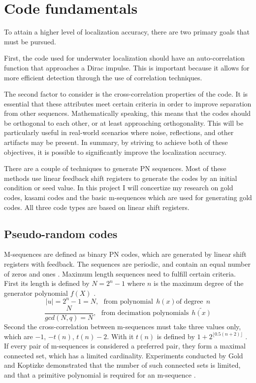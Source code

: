 \chapter{Code fundamentals}\label{chap:codefund}
To attain a higher level of localization accuracy, there are two primary goals that must be pursued.

First, the code used for underwater localization should have an auto-correlation function that approaches a Dirac impulse. This is important because it allows for more efficient detection through the use of correlation techniques.

The second factor to consider is the cross-correlation properties of the code. It is essential that these attributes meet certain criteria in order to improve separation from other sequences. Mathematically speaking, this means that the codes should be orthogonal to each other, or at least approaching orthogonality. This will be particularly useful in real-world scenarios where noise, reflections, and other artifacts may be present.
In summary, by striving to achieve both of these objectives, it is possible to significantly improve the localization accuracy.

There are a couple of techniques to generate PN sequences. Most of these methods use linear feedback shift registers to generate the codes by an initial condition or seed value. In this project I will concertize my research on gold codes, kasami codes and the basic m-sequences which are used for generating gold codes. All three code types are based on linear shift registers.

\section{Pseudo-random codes}
M-sequences are defined as binary PN codes, which are generated by linear shift registers with feedback. The sequences are periodic, and contain an equal number of zeros and ones \cite{proakis08}. 
Maximum length sequences need to fulfill certain criteria.  First its length is defined by $N=2^n - 1$ where $n$ is the maximum degree of the generator polynomial $f(X)$ \cite{sarwate80}.
 \begin{equation}
	 \lvert u\rvert=2^n-1=N,~~~\text{from polynomial}~~h(x) \text{of degree}~~n
\end{equation}
\begin{equation}
	\dfrac{N}{gcd(N,q)=N},~~~\text{from decimation polynomials}~~\widetilde{h(x)}
\end{equation}
Second the cross-correlation between m-sequences must take three values only, which are $-1$, $-t(n)$, $t(n) - 2$. With it $t(n)$ is defined by $1+2^{\lfloor0.5(n+2)\rfloor}$ \cite{sarwate80}.
If every pair of m-sequences is considered a preferred pair, they form a maximal connected set, which has a limited cardinality. Experiments conducted by Gold and Koptizke demonstrated that the number of such connected sets is limited, and that a primitive polynomial is required for an m-sequence \cite{gold65}.  

